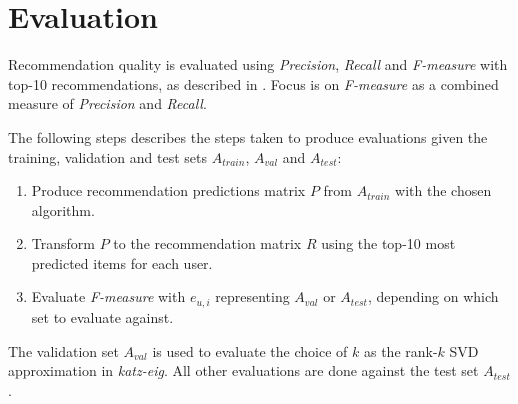 
\section{Evaluation}\label{sec:method:eval}

Recommendation quality is evaluated using \textit{Precision}, \textit{Recall} and \textit{F-measure} with top-10 recommendations, as described in . Focus is on \textit{F-measure} as a combined measure of \textit{Precision} and \textit{Recall}.

The following steps describes the steps taken to produce evaluations given the training, validation and test sets $A_{train}$, $A_{val}$ and $A_{test}$:

\begin{enumerate}
    \item Produce recommendation predictions matrix $P$ from $A_{train}$ with the chosen algorithm.
    \item Transform $P$ to the recommendation matrix $R$ using the top-10 most predicted items for each user.
    \item Evaluate \textit{F-measure} with $e_{u, i}$ representing $A_{val}$ or $A_{test}$, depending on which set to evaluate against.
\end{enumerate}

The validation set $A_{val}$ is used to evaluate the choice of $k$ as the rank-$k$ SVD approximation in \textit{katz-eig}. All other evaluations are done against the test set $A_{test}$.

